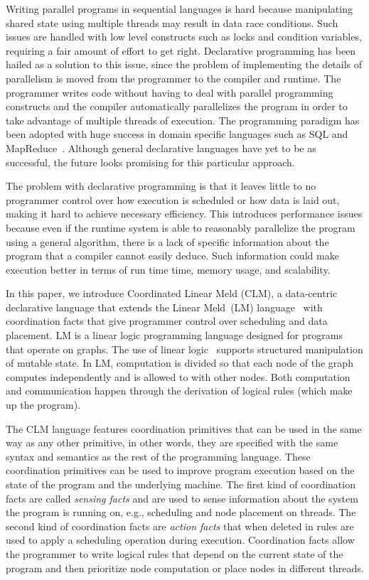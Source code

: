 Writing parallel programs in sequential languages is hard because manipulating
shared state using multiple threads may result in data race conditions. Such
issues are handled with low level constructs such as locks and condition
variables, requiring a fair amount of effort to get right.  Declarative
programming has been hailed as a solution to this issue, since the problem of
implementing the details of parallelism is moved from the programmer to the
compiler and runtime. The programmer writes code without having to deal with
parallel programming constructs and the compiler automatically parallelizes the
program in order to take advantage of multiple threads of execution.  The
programming paradigm has been adopted with huge success in domain specific
languages such as SQL and MapReduce~\cite{Dean:2008:MSD:1327452.1327492}.
Although general declarative languages have yet to be as successful, the future
looks promising for this particular approach.

The problem with declarative programming is that it leaves little to no
programmer control over how execution is scheduled or how data is laid out,
making it hard to achieve necessary efficiency. This introduces
performance issues because even if the runtime system is able to
reasonably parallelize the program using a general algorithm, there
is a lack of specific information about the program that a compiler
cannot easily deduce. Such information could make execution better in
terms of run time time, memory usage, and scalability.

In this paper, we introduce Coordinated Linear Meld (CLM), a data-centric declarative
language that extends the Linear Meld~(LM)
language~\cite{cruz-iclp14,cruz-ppdp14} with coordination facts that give
programmer control over scheduling and data placement. LM is a linear logic
programming language designed for programs that operate on graphs.  The use
of linear logic~\cite{girard-87} supports structured manipulation of mutable
state. In LM, computation is divided so that each node of the graph computes
independently and is allowed to  with other nodes.  Both
computation and communication happen through the derivation of logical rules
(which make up the program).

The CLM language features coordination primitives that can be used in the same
way as any other primitive, in other words, they are specified with the same
syntax and semantics as the rest of the programming language. These coordination
primitives can be used to improve program execution based on the state of the
program and the underlying machine. The first kind of coordination facts are
called \emph{sensing facts} and are used to sense information about the system
the program is running on, e.g., scheduling and node placement on threads. The
second kind of coordination facts are \emph{action facts} that when deleted in
rules are used to apply a scheduling operation during execution. Coordination
facts allow the programmer to write logical rules that depend on the current
state of the program and then prioritize node computation or place nodes in
different threads.

